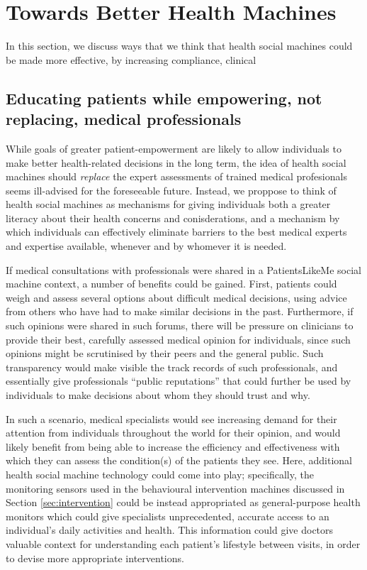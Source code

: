 \documentclass{sig-alternate}
\begin{document}
\section{Towards Better Health Machines}

In this section, we discuss ways that we think that health social
machines could be made more effective, by increasing compliance,
clinical 

\subsection{Educating patients while empowering, not replacing, medical professionals}

While goals of greater patient-empowerment are likely to allow
individuals to make better health-related decisions in the long term,
the idea of health social machines should \emph{replace} the expert
assessments of trained medical profesionals seems ill-advised for the
foreseeable future. Instead, we proppose to think of health social
machines as mechanisms for giving individuals both a greater literacy
about their health concerns and conisderations, and a mechanism by
which individuals can effectively eliminate barriers to the best
medical experts and expertise available, whenever and by whomever it
is needed.

If medical consultations with professionals were shared in a
PatientsLikeMe social machine context, a number of benefits could be
gained.  First, patients could weigh and assess several options about
difficult medical decisions, using advice from others who have had to
make similar decisions in the past.  Furthermore, if such opinions
were shared in such forums, there will be pressure on clinicians to
provide their best, carefully assessed medical opinion for
individuals, since such opinions might be scrutinised by their peers
and the general public.  Such transparency would make visible the
track records of such professionals, and essentially give
professionals ``public reputations'' that could further be used by
individuals to make decisions about whom they should trust and why.

In such a scenario, medical specialists would see increasing demand
for their attention from individuals throughout the world for their
opinion, and would likely benefit from being able to increase the
efficiency and effectiveness with which they can assess the
condition(s) of the patients they see.  Here, additional health social
machine technology could come into play; specifically, the monitoring
sensors used in the behavioural intervention machines discussed in
Section \ref{sec:intervention} could be instead appropriated as
general-purpose health monitors which could give specialists
unprecedented, accurate access to an individual's daily activities and
health.  This information could give doctors valuable context for
understanding each patient's lifestyle between visits, in order to
devise more appropriate interventions.
\end{document}
